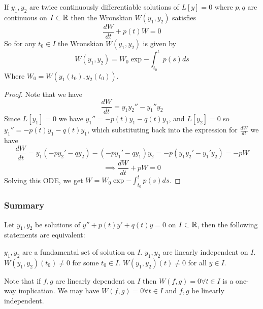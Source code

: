\begin{theorem} 
  If $y_1,y_2$ are twice continuously differentiable solutions of $L[y]=0$ where $p,q$ are
  continuous on $I\subset\mathbb R$ then the Wronskian $W(y_1,y_2)$ satisfies
  \[\frac{dW}{dt} + p(t) W =0\]
  So for any $t_0\in I$ the Wronskian $W(y_1,y_2)$ is given by 
  \[W(y_1, y_2) = W_0 \exp{-\int_{t_0}^t p(s) ds}\]
  Where $W_0= W(y_1(t_0), y_2(t_0))$.
\end{theorem}
\begin{proof}
 Note that we have 
 \[\frac{dW}{dt} = y_1y_2'' - y_1'' y_2\]
 Since $L[y_1]=0$ we have $y_1''=-p(t)y_1 - q(t)y_1$, and $L[y_2]=0$ so $y_1''=-p(t)y_1 -
 q(t)y_1$, which substituting back into the expression for $\frac{dW}{dt}$ we have
 \[\frac{dW}{dt} = y_1 (-py_2' - qy_2) - (-py_1'-qy_1)y_2 = -p(y_1y_2'-y_1'y_2) = -pW\]
 \[\implies \frac{dW}{dt}+pW = 0\]
 Solving this ODE, we get $W = W_0 \exp{-\int_{t_0}^{t}p(s) ds}$.
\end{proof}


\subsubsection{Summary}
Let $y_1,y_2$ be solutions of $y''+p(t) y' + q(t) y=0$ on $I\subset\mathbb R$, then the
following statements are equivalent:
\begin{itemize}
  \ii $y_1,y_2$ are a fundamental set of solution on $I$.
  \ii $y_1,y_2$ are linearly independent on $I$.
  \ii $W(y_1,y_2)(t_0)\neq 0$ for some $t_0\in I$.
  \ii $W(y_1,y_2)(t)\neq 0$ for all $y\in I$.
\end{itemize}

Note that if $f,g$ are linearly dependent on $I$ then $W(f,g)=0\forall t\in I$ is a
one-way implication. We may have $W(f,g)=0\forall t\in I$ and $f,g$ be linearly 
independent.
